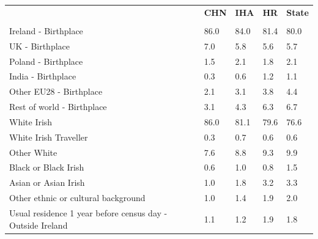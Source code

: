 \documentclass{article}
\begin{document}
\pagebreak
\begin{table}[h]	
\centering
		\begin{tabular}{KTTTT}
  \hline
& \textbf{CHN} & \textbf{IHA} & \textbf{HR}& \textbf{State}\\ 
  \hline
    \\ 
    \hline
Ireland - Birthplace & 86.0& 84.0& 81.4& 80.0\\
UK - Birthplace & 7.0& 5.8& 5.6& 5.7\\
Poland - Birthplace & 1.5& 2.1& 1.8& 2.1\\
India - Birthplace & 0.3& 0.6& 1.2& 1.1\\
Other EU28 - Birthplace & 2.1& 3.1& 3.8& 4.4\\
Rest of world - Birthplace & 3.1& 4.3& 6.3& 6.7\\
    \hline
White Irish & 86.0& 81.1& 79.6& 76.6\\
White Irish Traveller & 0.3& 0.7& 0.6& 0.6\\
Other White & 7.6& 8.8& 9.3& 9.9\\
Black or Black Irish & 0.6& 1.0& 0.8& 1.5\\
Asian or Asian Irish & 1.0& 1.8& 3.2& 3.3\\
Other ethnic or cultural background & 1.0& 1.4& 1.9& 2.0\\
    \hline
Usual residence 1 year before census day - Outside Ireland & 1.1& 1.2& 1.9& 1.8\\


\end{tabular}
\end{table}
\end{document}
